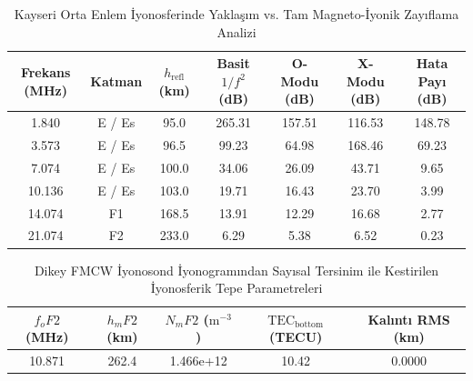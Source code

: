 \begin{table}[htbp]
\centering
\caption{Kayseri Orta Enlem İyonosferinde Yaklaşım vs. Tam Magneto-İyonik Zayıflama Analizi}
\begin{tabular}{ccccccc}
\hline
\textbf{Frekans (MHz)} & \textbf{Katman} & \textbf{$h_{\mathrm{refl}}$ (km)} & \textbf{Basit $1/f^2$ (dB)} & \textbf{O-Modu (dB)} & \textbf{X-Modu (dB)} & \textbf{Hata Payı (dB)} \\
\hline
1.840 & E / Es & 95.0 & 265.31 & 157.51 & 116.53 & 148.78 \\
3.573 & E / Es & 96.5 & 99.23 & 64.98 & 168.46 & 69.23 \\
7.074 & E / Es & 100.0 & 34.06 & 26.09 & 43.71 & 9.65 \\
10.136 & E / Es & 103.0 & 19.71 & 16.43 & 23.70 & 3.99 \\
14.074 & F1 & 168.5 & 13.91 & 12.29 & 16.68 & 2.77 \\
21.074 & F2 & 233.0 & 6.29 & 5.38 & 6.52 & 0.23 \\
\hline
\end{tabular}
\end{table}

\begin{table}[htbp]
\centering
\caption{Dikey FMCW İyonosond İyonogramından Sayısal Tersinim ile Kestirilen İyonosferik Tepe Parametreleri}
\begin{tabular}{ccccc}
\hline
\textbf{$f_oF2$ (MHz)} & \textbf{$h_mF2$ (km)} & \textbf{$N_mF2$ ($\mathrm{m}^{-3}$)} & \textbf{$\mathrm{TEC}_{\mathrm{bottom}}$ (TECU)} & \textbf{Kalıntı RMS (km)} \\
\hline
10.871 & 262.4 & 1.466e+12 & 10.42 & 0.0000 \\
\hline
\end{tabular}
\end{table}

